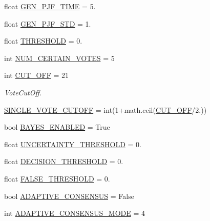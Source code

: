 \begin{DoxyCompactItemize}
\item 
float \mbox{\hyperlink{namespacedynamicfilterapp_1_1toggles_a39f595a7fd2eeddb13903a0e9b1f5c5f}{G\+E\+N\+\_\+\+P\+J\+F\+\_\+\+T\+I\+ME}} = 5.
\item 
float \mbox{\hyperlink{namespacedynamicfilterapp_1_1toggles_a338b6adc65ae090cdfc238116e9d028b}{G\+E\+N\+\_\+\+P\+J\+F\+\_\+\+S\+TD}} = 1.
\item 
float \mbox{\hyperlink{namespacedynamicfilterapp_1_1toggles_aa4a5babd6a47f588b10406827346b66f}{T\+H\+R\+E\+S\+H\+O\+LD}} = 0.
\item 
int \mbox{\hyperlink{namespacedynamicfilterapp_1_1toggles_a157bc167f366f75c9ba8d3e36e8d8540}{N\+U\+M\+\_\+\+C\+E\+R\+T\+A\+I\+N\+\_\+\+V\+O\+T\+ES}} = 5
\item 
int \mbox{\hyperlink{namespacedynamicfilterapp_1_1toggles_a914791c176a78c026dc76a18bcd88d73}{C\+U\+T\+\_\+\+O\+FF}} = 21
\begin{DoxyCompactList}\small\item\em Vote\+Cut\+Off. \end{DoxyCompactList}\item 
\mbox{\hyperlink{namespacedynamicfilterapp_1_1toggles_afa8e106b735033b706b1412e12f6783b}{S\+I\+N\+G\+L\+E\+\_\+\+V\+O\+T\+E\+\_\+\+C\+U\+T\+O\+FF}} = int(1+math.\+ceil(\mbox{\hyperlink{namespacedynamicfilterapp_1_1toggles_a914791c176a78c026dc76a18bcd88d73}{C\+U\+T\+\_\+\+O\+FF}}/2.))
\item 
bool \mbox{\hyperlink{namespacedynamicfilterapp_1_1toggles_adadcb301c2f0066591eaf0a4c08ac96d}{B\+A\+Y\+E\+S\+\_\+\+E\+N\+A\+B\+L\+ED}} = True
\item 
float \mbox{\hyperlink{namespacedynamicfilterapp_1_1toggles_aaefdc27b85545eb4a910f5c65f7d8bbb}{U\+N\+C\+E\+R\+T\+A\+I\+N\+T\+Y\+\_\+\+T\+H\+R\+E\+S\+H\+O\+LD}} = 0.
\item 
float \mbox{\hyperlink{namespacedynamicfilterapp_1_1toggles_ac4442b6c569574253ef445d09952d3f0}{D\+E\+C\+I\+S\+I\+O\+N\+\_\+\+T\+H\+R\+E\+S\+H\+O\+LD}} = 0.
\item 
float \mbox{\hyperlink{namespacedynamicfilterapp_1_1toggles_a31317fa26792fa204392549329cc31cb}{F\+A\+L\+S\+E\+\_\+\+T\+H\+R\+E\+S\+H\+O\+LD}} = 0.
\item 
bool \mbox{\hyperlink{namespacedynamicfilterapp_1_1toggles_a7b6800fe9bb5df8c84060ed96d9711ac}{A\+D\+A\+P\+T\+I\+V\+E\+\_\+\+C\+O\+N\+S\+E\+N\+S\+US}} = False
\item 
int \mbox{\hyperlink{namespacedynamicfilterapp_1_1toggles_a394fa3f8531c2ecc987f982367a4af2d}{A\+D\+A\+P\+T\+I\+V\+E\+\_\+\+C\+O\+N\+S\+E\+N\+S\+U\+S\+\_\+\+M\+O\+DE}} = 4

\end{DoxyCompactItemize}
